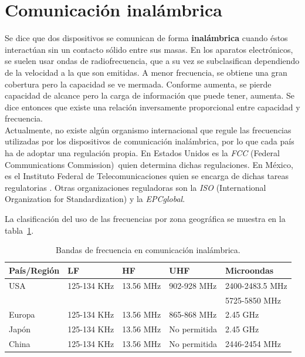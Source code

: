 \section{Comunicación inalámbrica}

Se dice que dos dispositivos se comunican de forma \textbf{inalámbrica} cuando éstos interactúan sin un contacto sólido entre sus masas. En los aparatos electrónicos, se suelen usar ondas de radiofrecuencia, que a su vez se subclasifican dependiendo de la velocidad a la que son emitidas. A menor frecuencia, se obtiene una gran cobertura pero la capacidad se ve mermada. Conforme aumenta, se pierde capacidad de alcance pero la carga de información que puede tener, aumenta. Se dice entonces que existe una relación inversamente proporcional entre capacidad y frecuencia.\\

Actualmente, no existe algún organismo internacional que regule las frecuencias utilizadas por los dispositivos de comunicación inalámbrica, por lo que cada país ha de adoptar una regulación propia. En Estados Unidos es la \textit{FCC} (Federal Communications Commission\footnotemark)~quien determina dichas regulaciones. En México, es el Instituto Federal de Telecomunicaciones quien se encarga de dichas tareas regulatorias \citep{porinstituto}. Otras organizaciones reguladoras son la \textit{ISO} (International Organization for Standardization\footnotemark) y la \textit{EPCglobal}.


La clasificación del uso de las frecuencias por zona geográfica se muestra en la tabla~\ref{Tab:BandasFreq}.

\begin{table}[H]
\begin{center}
\caption{Bandas de frecuencia en comunicación inalámbrica.}
\label{Tab:BandasFreq}
\begin{tabular}{|l|l|l|l|l|}
	\hline
	\textbf{País/Región} & \textbf{LF} & \textbf{HF} & \textbf{UHF} & \textbf{Microondas}\\
	\hline
	USA & 125-134 KHz & 13.56 MHz & 902-928 MHz & 2400-2483.5 MHz\\& & & & 5725-5850 MHz \\
	\hline
	Europa & 125-134 KHz & 13.56 MHz & 865-868 MHz & 2.45 GHz \\
	\hline
	Japón & 125-134 KHz & 13.56 MHz & No permitida & 2.45 GHz \\
	\hline
	China & 125-134 KHz & 13.56 MHz & No permitida & 2446-2454 MHz \\
	\hline
\end{tabular}
\end{center}
\end{table}

